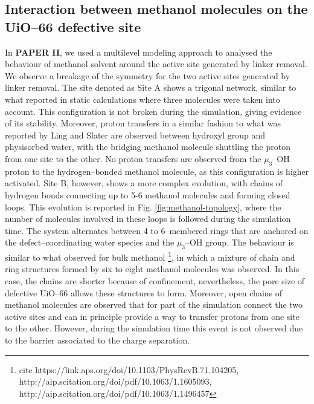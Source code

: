 \subsection{Interaction between methanol molecules on the UiO--66 defective site}
In \textbf{PAPER II}, we used a multilevel modeling approach to analysed the behaviour of methanol solvent around the active site generated by linker removal. We observe a breakage of the symmetry for the two active sites generated by linker removal. The site denoted as Site A shows a trigonal network, similar to what reported in static calculations where three molecules were taken into account. This configuration is not broken during the simulation, giving evidence of its stability. Moreover, proton transfers in a similar fashion to what was reported by Ling and Slater \cite{ling2016dynamic} are observed between hydroxyl group and physisorbed water, with the bridging methanol molecule shuttling the proton from one site to the other. No proton transfers are observed from the $\mu_3$--OH proton to the hydrogen--bonded methanol molecule, as this configuration is higher activated. Site B, however, shows a more complex evolution, with chains of hydrogen bonds connecting up to 5-6 methanol molecules and forming closed loops. This evolution is reported in Fig. \ref{fig:methanol-topology}, where the number of molecules involved in these loops is followed during the simulation time. The system alternates between 4 to 6--membered rings that are anchored on the defect--coordinating water species and the $\mu_3$--OH group. The behaviour is similar to what observed for bulk methanol \footnote{cite https://link.aps.org/doi/10.1103/PhysRevB.71.104205, http://aip.scitation.org/doi/pdf/10.1063/1.1605093, http://aip.scitation.org/doi/pdf/10.1063/1.1496457 }, in which a mixture of chain and ring structures formed by six to eight methanol molecules was observed. In this case, the chains are shorter because of confinement, nevertheless, the pore size of defective UiO--66 allows these structures to form. Moreover, open chains of methanol molecules are observed that for part of the simulation connect the two active sites and can in principle provide a way to transfer protons from one site to the other. However, during the simulation time this event is not observed due to the barrier associated to the charge separation. 

